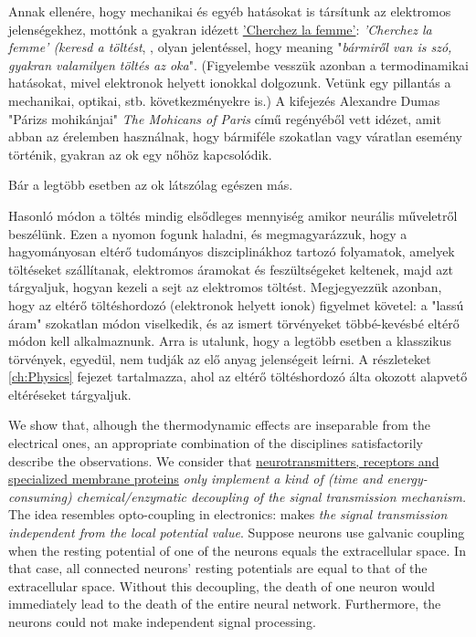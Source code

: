 %
\else
%
Annak ellenére, hogy mechanikai és egyéb hatásokat is társítunk az elektromos jelenségekhez, mottónk
a gyakran idézett 
\href{https://en.wikipedia.org/wiki/Cherchez_la_femme"}{'Cherchez la femme'}:
\textit{'Cherchez la femme' (keresd a töltést},
,
olyan jelentéssel, hogy 
meaning "\textit{bármiről van is szó, gyakran valamilyen töltés az oka}". (Figyelembe vesszük azonban a termodinamikai hatásokat, mivel elektronok helyett ionokkal dolgozunk. Vetünk egy pillantás a mechanikai, optikai, stb. következményekre is.)
A kifejezés Alexandre Dumas "Párizs mohikánjai" \textit{The Mohicans of Paris} című regényéből vett idézet, amit abban az érelemben használnak, hogy
bármiféle szokatlan vagy váratlan esemény történik, 
gyakran az ok egy nőhöz kapcsolódik.

Bár a legtöbb esetben az ok látszólag egészen más.


Hasonló módon a töltés mindig elsődleges mennyiség amikor neurális műveletről beszélünk.
Ezen a nyomon fogunk haladni, és megmagyarázzuk,
hogy a hagyományosan eltérő tudományos diszciplinákhoz 
tartozó folyamatok, amelyek töltéseket szállítanak,
elektromos áramokat és feszültségeket keltenek,
majd azt tárgyaljuk, hogyan kezeli a sejt az elektromos töltést.
Megjegyezzük azonban, hogy az eltérő töltéshordozó
(elektronok helyett ionok) figyelmet követel:
a "lassú áram" szokatlan módon viselkedik,
és az ismert törvényeket többé-kevésbé
eltérő módon kell alkalmaznunk.
Arra is utalunk, hogy a legtöbb esetben a klasszikus 
törvények, egyedül, nem tudják az elő anyag
jelenségeit leírni.
A részleteket \ref{ch:Physics} fejezet tartalmazza,
ahol az eltérő töltéshordozó álta okozott
alapvető eltéréseket tárgyaljuk.
\fi

\ifx\magyar\undefined

We show that, alhough the thermodynamic effects
are inseparable from the electrical ones, an appropriate combination of the disciplines satisfactorily describe the observations.
We consider that \href{https://neuronaldynamics.epfl.ch/online/Ch1.S1.html}{neurotransmitters, receptors and specialized membrane proteins}
\textit{only implement a kind of (time and energy-consuming)
	chemical/enzymatic decoupling
	of the signal transmission mechanism.} The idea resembles opto-coupling in electronics:
makes \textit{the signal transmission independent from the local potential value}.
Suppose neurons use galvanic coupling
when the resting potential of one of the neurons equals the extracellular space. In that case,
all connected neurons' resting potentials are
equal to that of the extracellular space. Without this decoupling, the death
of one neuron would immediately lead to the death of the entire neural network.
Furthermore, the neurons could not make independent signal processing.

